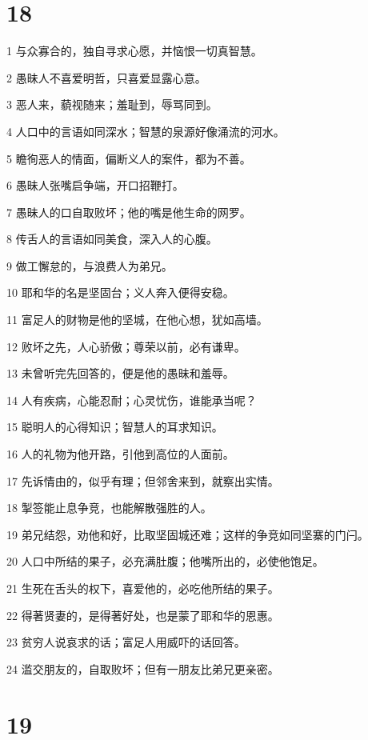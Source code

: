 \chapter{18}

\par 1 与众寡合的，独自寻求心愿，并恼恨一切真智慧。
\par 2 愚昧人不喜爱明哲，只喜爱显露心意。
\par 3 恶人来，藐视随来；羞耻到，辱骂同到。
\par 4 人口中的言语如同深水；智慧的泉源好像涌流的河水。
\par 5 瞻徇恶人的情面，偏断义人的案件，都为不善。
\par 6 愚昧人张嘴启争端，开口招鞭打。
\par 7 愚昧人的口自取败坏；他的嘴是他生命的网罗。
\par 8 传舌人的言语如同美食，深入人的心腹。
\par 9 做工懈怠的，与浪费人为弟兄。
\par 10 耶和华的名是坚固台；义人奔入便得安稳。
\par 11 富足人的财物是他的坚城，在他心想，犹如高墙。
\par 12 败坏之先，人心骄傲；尊荣以前，必有谦卑。
\par 13 未曾听完先回答的，便是他的愚昧和羞辱。
\par 14 人有疾病，心能忍耐；心灵忧伤，谁能承当呢？
\par 15 聪明人的心得知识；智慧人的耳求知识。
\par 16 人的礼物为他开路，引他到高位的人面前。
\par 17 先诉情由的，似乎有理；但邻舍来到，就察出实情。
\par 18 掣签能止息争竞，也能解散强胜的人。
\par 19 弟兄结怨，劝他和好，比取坚固城还难；这样的争竞如同坚寨的门闩。
\par 20 人口中所结的果子，必充满肚腹；他嘴所出的，必使他饱足。
\par 21 生死在舌头的权下，喜爱他的，必吃他所结的果子。
\par 22 得著贤妻的，是得著好处，也是蒙了耶和华的恩惠。
\par 23 贫穷人说哀求的话；富足人用威吓的话回答。
\par 24 滥交朋友的，自取败坏；但有一朋友比弟兄更亲密。

\chapter{19}

